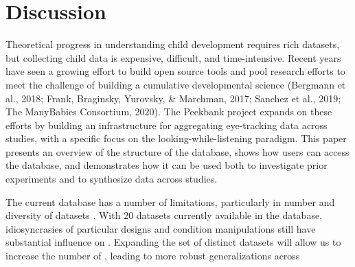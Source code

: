 \documentclass[
  english,
  man,floatsintext]{apa6}
\providecommand{\DIFaddtex}[1]{{\protect\color{blue}{#1}}} %
\providecommand{\DIFdeltex}[1]{}                      %
\providecommand{\DIFaddbegin}{} %
\providecommand{\DIFaddend}{} %
\providecommand{\DIFdelbegin}{} %
\providecommand{\DIFdelend}{} %
\providecommand{\DIFdelFL}[1]{\DIFdel{#1}} %
\providecommand{\DIFadd}[1]{\texorpdfstring{\DIFaddtex{#1}}{#1}} %
\providecommand{\DIFdel}[1]{\texorpdfstring{\DIFdeltex{#1}}{}} %
\newcommand{\DIFscaledelfig}{0.5}
\newlength{\DIFdelgraphicswidth} %
\newlength{\DIFdelgraphicsheight} %
\newcommand{\DIFaddincludegraphics}[2][]{{\color{blue}\fbox{\DIFOincludegraphics[#1]{#2}}}} %
\newcommand{\DIFdelincludegraphics}[2][]{%
\sbox{\DIFdelgraphicsbox}{\DIFOincludegraphics[#1]{#2}}%
\settoboxwidth{\DIFdelgraphicswidth}{\DIFdelgraphicsbox} %
\settoboxtotalheight{\DIFdelgraphicsheight}{\DIFdelgraphicsbox} %
\scalebox{\DIFscaledelfig}{%
\parbox[b]{\DIFdelgraphicswidth}{\usebox{\DIFdelgraphicsbox}\\[-\baselineskip] \rule{\DIFdelgraphicswidth}{0em}}\llap{\resizebox{\DIFdelgraphicswidth}{\DIFdelgraphicsheight}{%
\setlength{\unitlength}{\DIFdelgraphicswidth}%
\begin{picture}(1,1)%
\thicklines\linethickness{2pt} %
{\color[rgb]{1,0,0}\put(0,0){\framebox(1,1){}}}%
{\color[rgb]{1,0,0}\put(0,0){\line( 1,1){1}}}%
{\color[rgb]{1,0,0}\put(0,1){\line(1,-1){1}}}%
\end{picture}%
}\hspace*{3pt}}} %
} %
\DeclareRobustCommand{\DIFaddbegin}{\DIFOaddbegin \let\includegraphics\DIFaddincludegraphics} %
\DeclareRobustCommand{\DIFaddend}{\DIFOaddend \let\includegraphics\DIFOincludegraphics} %
\DeclareRobustCommand{\DIFdelbegin}{\DIFOdelbegin \let\includegraphics\DIFdelincludegraphics} %
\DeclareRobustCommand{\DIFdelend}{\DIFOaddend \let\includegraphics\DIFOincludegraphics} %
\begin{document}
{%
\DIFdelFL{Time course plot for four well-represented target items in the Peekbank dataset, split by three age groups. Each line represents children's average looking to the target image after the onset of the target label (dashed vertical line). Error bars represent 95\% CIs.}}

\DIFdelend \hypertarget{discussion}{%
\section{Discussion}\label{discussion}}

Theoretical progress in understanding child development requires rich datasets, but collecting child data is expensive, difficult, and time-intensive.
Recent years have seen a growing effort to build open source tools and pool research efforts to meet the challenge of building a cumulative developmental science (Bergmann et al., 2018; Frank, Braginsky, Yurovsky, \& Marchman, 2017; Sanchez et al., 2019; The ManyBabies Consortium, 2020).
The Peekbank project expands on these efforts by building an infrastructure for aggregating eye-tracking data across studies, with a specific focus on the looking-while-listening paradigm.
This paper presents an overview of the structure of the database, shows how users can access the database, and demonstrates how it can be used both to investigate prior experiments and to synthesize data across studies.

The current database has a number of limitations, particularly in \DIFdelbegin \DIFdel{its }\DIFdelend \DIFaddbegin \DIFadd{the }\DIFaddend number and diversity of datasets \DIFaddbegin \DIFadd{it contains}\DIFaddend .
With 20 datasets currently available in the database, idiosyncrasies of particular designs and condition manipulations still have \DIFaddbegin \DIFadd{a }\DIFaddend substantial influence on \DIFdelbegin \DIFdel{modeling results }\DIFdelend \DIFaddbegin \DIFadd{the results of particular analyses, as discussed above in our item analysis example}\DIFaddend .
Expanding the set of distinct datasets will allow us to increase the number of \DIFdelbegin \DIFdel{observations per item across datasets }\DIFdelend \DIFaddbegin \DIFadd{datasets that contain specific items}\DIFaddend , leading to more robust generalizations across \DIFdelbegin \DIFdel{item-level variability.}\DIFdelend \DIFaddbegin \DIFadd{the many sources of variation that are confounded within studies (e.g., item set, participant age range, and specific experimental parameters).
A critical next step will be the development of analytic models that take this structure into account in making generalizations across datasets.
}
\end{document}
